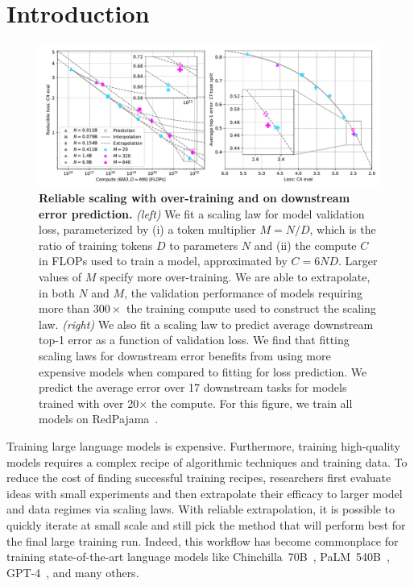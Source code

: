 \section{Introduction}
\label{sec:intro}
\begin{figure}[t!]
    \centering \includegraphics[width=\linewidth]{figs/figure1_rpj_c4_val.pdf}
    \caption{
    \textbf{Reliable scaling with over-training and on downstream error prediction.}
    \emph{(left)}
    We fit a scaling law for model validation loss, parameterized by (i) a token multiplier $M = N/D$, which is the ratio of training tokens $D$ to parameters $N$ and (ii) the compute $C$ in FLOPs used to train a model, approximated by $C=6ND$.
    Larger values of $M$ specify more over-training.
    We are able to extrapolate, in both $N$ and $M$, the validation performance of models requiring more than $300\times$ the training compute used to construct the scaling law.
    \emph{(right)}
    We also fit a scaling law to predict average downstream top-1 error as a function of validation loss.
    We find that fitting scaling laws for downstream error benefits from using more expensive models when compared to fitting for loss prediction.
    We predict the average error over 17 downstream tasks for models trained with over 20$\times$ the compute.
    For this figure, we train all models on RedPajama~\cite{rpj}.
    }
    \label{fig:fig1}
    \vspace*{-3mm}
\end{figure}

Training large language models is expensive.
Furthermore, training high-quality models requires a complex recipe of algorithmic techniques and training data.
To reduce the cost of finding successful training recipes, researchers first evaluate ideas with small experiments and then extrapolate their efficacy to larger model and data regimes via scaling laws.
With reliable extrapolation, it is possible to quickly iterate at small scale and still pick the method that will perform best for the final large training run.
Indeed, this workflow has become commonplace for training state-of-the-art language models like Chinchilla~70B~\cite{chinchilla}, PaLM~540B~\cite{Chowdhery2022PaLMSL}, GPT-4~\cite{gpt4}, and many others.

